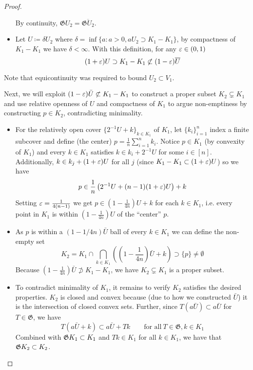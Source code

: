 \begin{proof}
\begin{itemize}
\begin{itemize}
      \end{itemize}
      By continuity, $\mathfrak{G} U_2 = \overline{\mathfrak{G} U_2}$.
    \item Let $U \coloneqq \delta U_2$ where
      $\delta = \inf \{ a : a > 0, a U_2 \supset K_1 - K_1 \}$,
      by compactness of $K_1 - K_1$ we have $\delta < \infty$.
      With this definition, for any $\varepsilon \in (0,1)$
      \[
        (1+\varepsilon) U \supset K_1 - K_1 \not\subset (1-\varepsilon) \overline{U}
      \]
  \end{itemize}
  Note that equicontinuity was required to bound
  $U_2 \subset V_1$.

  Next, we will exploit $(1-\varepsilon) \bar{U} \not\subset K_1 - K_1$ to
  construct a proper subset $K_2 \subsetneq K_1$ and use
  relative openness of $U$ and compactness of $K_1$ to argue non-emptiness
  by constructing $p \in K_2$, contradicting minimality.
  \begin{itemize}
    \item For the relatively open cover $\{2^{-1} U + k\}_{k \in K_1}$ of
      $K_1$, let $\{k_i\}_{i=1}^n$ index a finite subcover and define (the
      center)
      $p = \frac{1}{n} \sum_{i=1}^n k_i$.
      Notice $p \in K_1$ (by convexity of $K_1$) and
      every $k \in K_1$
      satisfies $k \in k_i + 2^{-1} U$ for some $i \in [n]$.
      Additionally, $k \in k_j + (1 + \varepsilon) U$ for all $j$
      (since $K_1 - K_1 \subset (1+\varepsilon) U$) so we have
      \[
        p \in \frac{1}{n} \left(2^{-1} U + (n-1) (1+\varepsilon) U \right) + k
      \]
      Setting $\varepsilon = \frac{1}{4(n-1)}$ we get $p \in (1 - \frac{1}{4n}) U + k$
      for each $k \in K_1$, i.e. every point in $K_1$ is within $(1 - \frac{1}{4 n} )U$
      of the ``center'' $p$.
    \item As $p$ is within a $(1-1/4n)\bar{U}$ ball of every $k \in K_1$
      we can define the non-empty set
      \[
        K_2 = K_1 \cap \bigcap_{k \in K_1} \left(
          \left(
            1 - \frac{1}{4n}
          \right) \bar{U} + k
        \right) \supset \{p\} \neq \emptyset
      \]
      Because $(1 - \frac{1}{4n} ) \bar{U} \not\supset K_1 - K_1$, we have
      $K_2 \subsetneq K_1$ is a proper subset.
    \item To contradict minimality of $K_1$, it remains to verify
      $K_2$ satisfies the desired properties.
      $K_2$ is closed and convex because (due to how we constructed $\bar{U}$)
      it is the intersection of closed convex sets.
      Further, since $T(a \bar{U}) \subset a \bar{U}$ for $T \in
      \mathfrak{G}$, we have
      \[
        T(a\bar{U} + k)
        \subset a \bar{U} + T k
        \qquad \text{for all}~T \in \mathfrak{G}, k \in K_1
      \]
      Combined with $\mathfrak{G} K_1 \subset K_1$
      and $T k \in K_1$ for all $k \in K_1$, we
      have that $\mathfrak{G} K_2 \subset K_2$.
  \end{itemize}
\end{proof}
